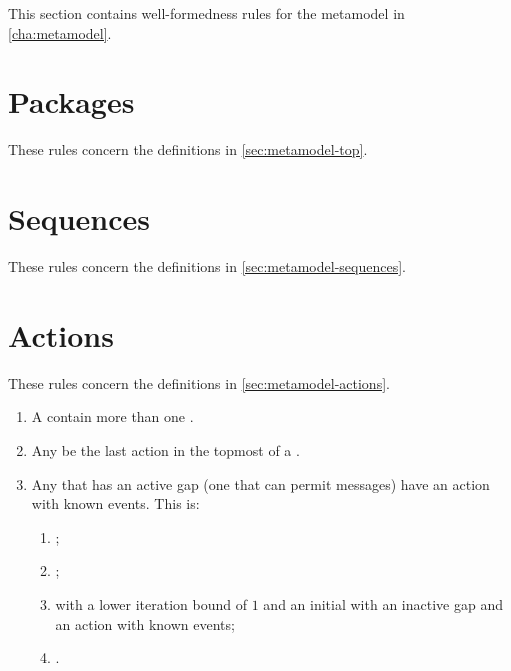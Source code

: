 
This section contains well-formedness rules for the metamodel in
\cref{cha:metamodel}.


\section{Packages}\label{sec:wf-top}

These rules concern the definitions in \cref{sec:metamodel-top}.

\section{Sequences}\label{sec:wf-sequences}

These rules concern the definitions in \cref{sec:metamodel-sequences}.

\section{Actions}\label{sec:wf-actions}

These rules concern the definitions in \cref{sec:metamodel-actions}.

\begin{enumerate}
\item
  A \msequence{} \rfcmustnot{} contain more than one \mfinalaction.
\item
  Any \mfinalaction{} \rfcmust{} be the last action in the topmost
  \msubsequence{} of a \msequence.
\item
  Any \msequencestep{} that has an active gap (one that can permit messages)
  \rfcmust{} have an action with known events.  This is:
  \begin{enumerate}
  \item \marrowaction;
  \item \mfinalaction;
  \item \mloopaction{} with a lower iteration bound of \(1\) and an
    initial \msequencestep{} with an inactive gap and an action with
    known events;
  \item {}.
  \end{enumerate}
\end{enumerate}

